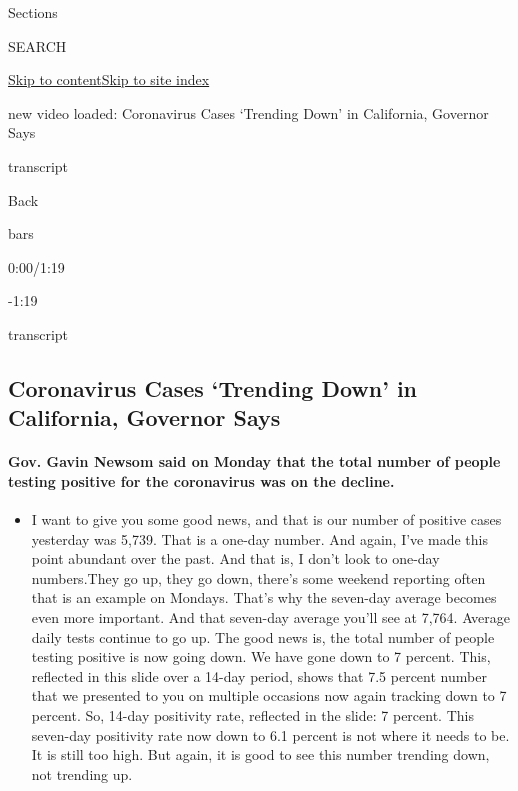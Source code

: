 Sections

SEARCH

\protect\hyperlink{site-content}{Skip to
content}\protect\hyperlink{site-index}{Skip to site index}

new video loaded: Coronavirus Cases `Trending Down' in California,
Governor Says

transcript

Back

bars

0:00/1:19

-1:19

transcript

\hypertarget{coronavirus-cases-trending-down-in-california-governor-says}{%
\subsection{Coronavirus Cases `Trending Down' in California, Governor
Says}\label{coronavirus-cases-trending-down-in-california-governor-says}}

\hypertarget{gov-gavin-newsom-said-on-monday-that-the-total-number-of-people-testing-positive-for-the-coronavirus-was-on-the-decline}{%
\paragraph{Gov. Gavin Newsom said on Monday that the total number of
people testing positive for the coronavirus was on the
decline.}\label{gov-gavin-newsom-said-on-monday-that-the-total-number-of-people-testing-positive-for-the-coronavirus-was-on-the-decline}}

\begin{itemize}
\tightlist
\item
  I want to give you some good news, and that is our number of positive
  cases yesterday was 5,739. That is a one-day number. And again, I've
  made this point abundant over the past. And that is, I don't look to
  one-day numbers.They go up, they go down, there's some weekend
  reporting often that is an example on Mondays. That's why the
  seven-day average becomes even more important. And that seven-day
  average you'll see at 7,764. Average daily tests continue to go up.
  The good news is, the total number of people testing positive is now
  going down. We have gone down to 7 percent. This, reflected in this
  slide over a 14-day period, shows that 7.5 percent number that we
  presented to you on multiple occasions now again tracking down to 7
  percent. So, 14-day positivity rate, reflected in the slide: 7
  percent. This seven-day positivity rate now down to 6.1 percent is not
  where it needs to be. It is still too high. But again, it is good to
  see this number trending down, not trending up.
\end{itemize}

